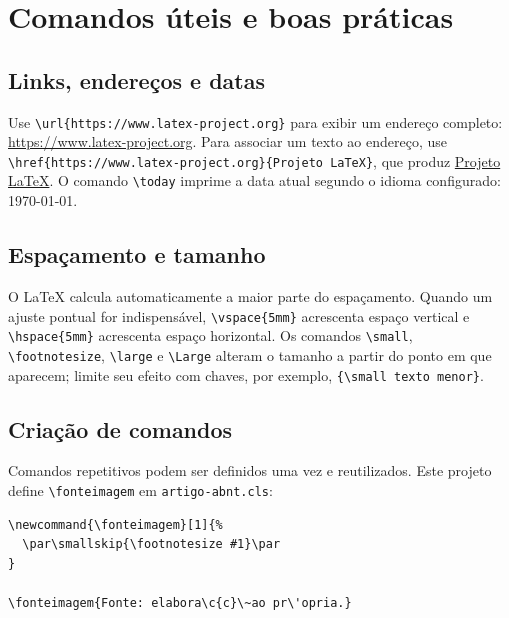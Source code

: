 \section{Comandos úteis e boas práticas}\label{sec:boas-praticas}

\subsection{Links, endereços e datas}

Use \lstinline|\url{https://www.latex-project.org}| para exibir um endereço completo: \url{https://www.latex-project.org}. Para associar um texto ao endereço, use \lstinline|\href{https://www.latex-project.org}{Projeto LaTeX}|, que produz \href{https://www.latex-project.org}{Projeto LaTeX}. O comando \lstinline|\today| imprime a data atual segundo o idioma configurado: \today.

\subsection{Espaçamento e tamanho}

O \LaTeX{} calcula automaticamente a maior parte do espaçamento. Quando um ajuste pontual for indispensável, \lstinline|\vspace{5mm}| acrescenta espaço vertical e \lstinline|\hspace{5mm}| acrescenta espaço horizontal. Os comandos \lstinline|\small|, \lstinline|\footnotesize|, \lstinline|\large| e \lstinline|\Large| alteram o tamanho a partir do ponto em que aparecem; limite seu efeito com chaves, por exemplo, \lstinline|{\small texto menor}|.

\subsection{Criação de comandos}

Comandos repetitivos podem ser definidos uma vez e reutilizados. Este projeto define \lstinline|\fonteimagem| em \texttt{artigo-abnt.cls}:

\begin{lstlisting}[language={[LaTeX]TeX},caption={Definição e uso de um comando com argumento},label={cod:comando}]
\newcommand{\fonteimagem}[1]{%
  \par\smallskip{\footnotesize #1}\par
}

\fonteimagem{Fonte: elabora\c{c}\~ao pr\'opria.}
\end{lstlisting}

